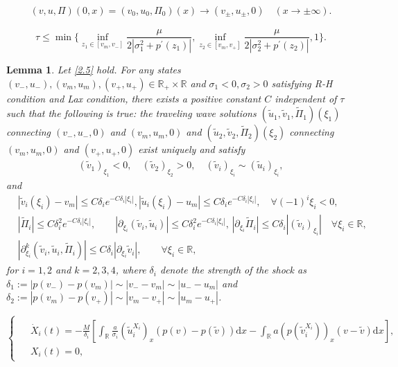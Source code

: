 \documentclass[10pt,a4paper]{amsart}
\newtheorem{lemma}{Lemma}
\newcommand{\dif}{\mathrm{d}}
\begin{document}
\begin{align} \label{1.4}
(v, u, \Pi)(0,x)=(v_0, u_0, \Pi_0)(x)\rightarrow(v_{\pm},u_{\pm},0) \quad (x\rightarrow\pm\infty).
\end{align}

\begin{equation}\label{2.5}
\tau\leq \min\{\inf\limits_{z_1\in[v_m,v_-]}\frac{\mu}{2|\sigma_1^2+p^{\prime}(z_1)|},
\inf\limits_{z_2\in[v_m,v_+]}\frac{\mu}{2|\sigma_2^2+p^{\prime}(z_2)|},
1\}.
\end{equation}

\begin{lemma}\label{le2.1}
Let \eqref{2.5} hold.
 For any states $(v_-,u_-),(v_m,u_m),(v_+,u_+)\in \mathbb{R}_+\times\mathbb{R}$ and $\sigma_1<0,\sigma_2>0$ satisfying R-H condition and Lax condition, there exists a positive constant $C$ independent of $\tau$ such that the following is true: the traveling wave solutions $(\widetilde{u}_1,\widetilde{v}_1,\widetilde{\Pi}_1)(\xi_1)$ connecting $(v_-,u_-,0)$ and $(v_m,u_m,0)$ and $(\widetilde{u}_2,\widetilde{v}_2,\widetilde{\Pi}_2)(\xi_2)$ connecting $(v_m,u_m,0)$ and $(v_+,u_+,0)$ exist uniquely and satisfy
\begin{align*}
(\widetilde{v}_1)_{\xi_1}<0,\quad
(\widetilde{v}_2)_{\xi_2}>0,\quad
(\widetilde{v}_i)_{\xi_i}\sim(\widetilde{u}_i)_{\xi_i},
\end{align*}
and
\begin{align*}
&|\widetilde{v}_i(\xi_i)-v_m|\leq C\delta_i e^{-C\delta_i|\xi_i|},
|\widetilde{u}_i(\xi_i)-u_m|\leq C\delta_i e^{-C\delta_i|\xi_i|},\quad  \forall (-1)^i\xi_i<0,\\
&|\widetilde{\Pi}_i|\leq C\delta_i^2 e^{-C\delta_i|\xi_i|},\quad \quad
|\partial_{\xi_i}(\widetilde{v}_i,\widetilde{u}_i)|\leq C\delta_i^2e^{-C\delta_i|\xi_i|},  \,   |\partial_{\xi_i} \widetilde{\Pi}_i|\le C \delta_i |(\widetilde v_i)_{\xi_i}| \quad \forall\xi_i\in\mathbb{R},\\
&|\partial^k_{\xi_i}(\widetilde{v}_i,\widetilde{u}_i,\widetilde{\Pi}_i)|\leq C\delta_i|\partial_{\xi_i}\widetilde{v}_i|, \qquad \forall\xi_i\in\mathbb{R},
\end{align*}
for $i=1,2$ and $k=2,3,4$, where $\delta_i$ denote the strength of the shock as $\delta_1:=|p(v_-)-p(v_m)|\sim|v_--v_m|\sim|u_--u_m|$ and $\delta_2:=|p(v_m)-p(v_+)|\sim|v_m-v_+|\sim|u_m-u_+|$.
\end{lemma}

\begin{equation}\label{2.10}
\begin{cases}
\begin{aligned}
&\dot{X}_i(t)=-\frac{M}{\delta_i}
\left[\int_{\mathbb{R}}\frac{a}{\sigma_i}(\widetilde{u}_i^{X_i})_x(p(v)-p(\widetilde{v}))\dif x
-\int_{\mathbb{R}}a\left(p(\widetilde{v}_i^{X_i})\right)_x(v-\widetilde{v})\dif x\right],\\
&X_i(t)=0,
\end{aligned}
\end{cases}
\end{equation}
\end{document}
